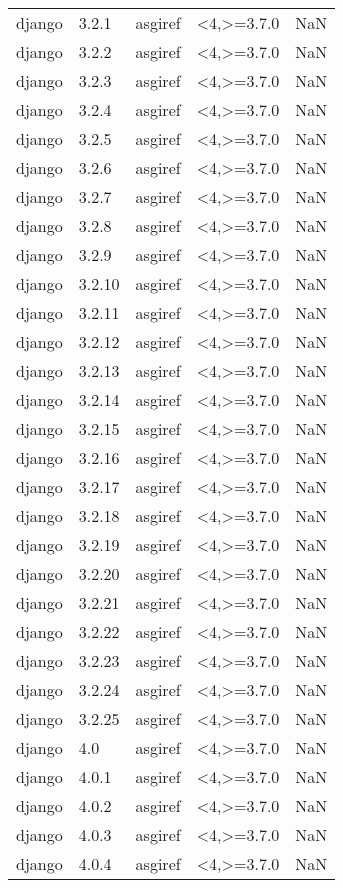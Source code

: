 \begin{tabular}{llllr}
django & 3.2.1 & asgiref & <4,>=3.7.0 & NaN \\
django & 3.2.2 & asgiref & <4,>=3.7.0 & NaN \\
django & 3.2.3 & asgiref & <4,>=3.7.0 & NaN \\
django & 3.2.4 & asgiref & <4,>=3.7.0 & NaN \\
django & 3.2.5 & asgiref & <4,>=3.7.0 & NaN \\
django & 3.2.6 & asgiref & <4,>=3.7.0 & NaN \\
django & 3.2.7 & asgiref & <4,>=3.7.0 & NaN \\
django & 3.2.8 & asgiref & <4,>=3.7.0 & NaN \\
django & 3.2.9 & asgiref & <4,>=3.7.0 & NaN \\
django & 3.2.10 & asgiref & <4,>=3.7.0 & NaN \\
django & 3.2.11 & asgiref & <4,>=3.7.0 & NaN \\
django & 3.2.12 & asgiref & <4,>=3.7.0 & NaN \\
django & 3.2.13 & asgiref & <4,>=3.7.0 & NaN \\
django & 3.2.14 & asgiref & <4,>=3.7.0 & NaN \\
django & 3.2.15 & asgiref & <4,>=3.7.0 & NaN \\
django & 3.2.16 & asgiref & <4,>=3.7.0 & NaN \\
django & 3.2.17 & asgiref & <4,>=3.7.0 & NaN \\
django & 3.2.18 & asgiref & <4,>=3.7.0 & NaN \\
django & 3.2.19 & asgiref & <4,>=3.7.0 & NaN \\
django & 3.2.20 & asgiref & <4,>=3.7.0 & NaN \\
django & 3.2.21 & asgiref & <4,>=3.7.0 & NaN \\
django & 3.2.22 & asgiref & <4,>=3.7.0 & NaN \\
django & 3.2.23 & asgiref & <4,>=3.7.0 & NaN \\
django & 3.2.24 & asgiref & <4,>=3.7.0 & NaN \\
django & 3.2.25 & asgiref & <4,>=3.7.0 & NaN \\
django & 4.0 & asgiref & <4,>=3.7.0 & NaN \\
django & 4.0.1 & asgiref & <4,>=3.7.0 & NaN \\
django & 4.0.2 & asgiref & <4,>=3.7.0 & NaN \\
django & 4.0.3 & asgiref & <4,>=3.7.0 & NaN \\
django & 4.0.4 & asgiref & <4,>=3.7.0 & NaN \\

\end{tabular}
